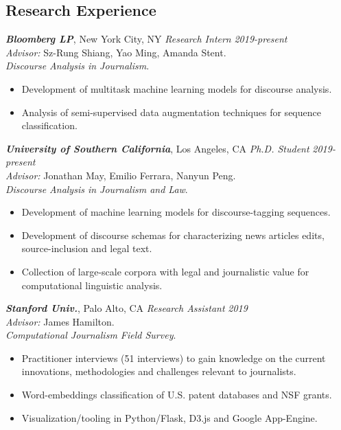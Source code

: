 \documentclass[margin]{res}
\begin{document}
\begin{resume}
\section{Research Experience}
{\sl \bf Bloomberg LP}, New York City, NY {\sl Research Intern} \hfill {\it 2019-present}\\
\textit{Advisor:} Sz-Rung Shiang, Yao Ming, Amanda Stent.\\
\textit{Discourse Analysis in Journalism}.
\begin{itemize}
	\item Development of multitask machine learning models for discourse analysis.
	\item Analysis of semi-supervised data augmentation techniques for sequence classification.
\end{itemize}

{\sl \bf University of Southern California}, Los Angeles, CA {\sl Ph.D. Student} \hfill {\it 2019-present}\\
\textit{Advisor:} Jonathan May, Emilio Ferrara, Nanyun Peng.\\
\textit{Discourse Analysis in Journalism and Law}.
\begin{itemize}
	\item Development of machine learning models for discourse-tagging sequences.
	\item Development of discourse schemas for characterizing news articles edits, source-inclusion and legal text.
	\item Collection of large-scale corpora with legal and journalistic value for computational linguistic analysis.
\end{itemize}

{\sl \bf Stanford Univ.}, Palo Alto, CA {\sl Research Assistant} \hfill {\it 2019}\\
\textit{Advisor:} James Hamilton.\\
\textit{Computational Journalism Field Survey}.
\begin{itemize}
	\item Practitioner interviews (51 interviews) to gain knowledge on the current innovations, methodologies and challenges relevant to journalists.
	\item Word-embeddings classification of U.S. patent databases and NSF grants.
	\item Visualization/tooling in Python/Flask, D3.js and Google App-Engine.
\end{itemize}


\end{resume}
\end{document}
